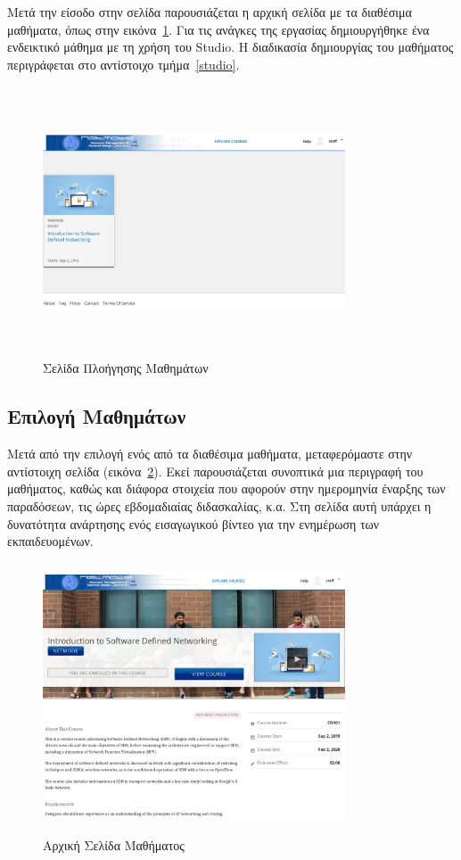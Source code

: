 \documentclass[12pt]{report}
\begin{document}
Μετά την είσοδο στην σελίδα παρουσιάζεται η αρχική σελίδα με τα διαθέσιμα μαθήματα, όπως στην εικόνα~\ref{fig:microsite-explore-course}. Για τις ανάγκες της εργασίας δημιουργήθηκε ένα ενδεικτικό μάθημα με τη χρήση του \textlatin{Studio}. Η διαδικασία δημιουργίας του μαθήματος περιγράφεται στο αντίστοιχο τμήμα~\ref{studio}.
\begin{figure}[!htbp]
\centering
\includegraphics[width=0.8\textwidth, height=8cm]{microsite-explore-courses}
\caption{Σελίδα Πλοήγησης Μαθημάτων}
\label{fig:microsite-explore-course}
\end{figure}

\subsection{Επιλογή Μαθημάτων}
Μετά από την επιλογή ενός από τα διαθέσιμα μαθήματα, μεταφερόμαστε στην αντίστοιχη σελίδα (εικόνα~\ref{fig:microsite-course1}). Εκεί παρουσιάζεται συνοπτικά μια περιγραφή του μαθήματος, καθώς και διάφορα στοιχεία που αφορούν στην ημερομηνία έναρξης των παραδόσεων, τις ώρες εβδομαδιαίας διδασκαλίας, κ.α. Στη σελίδα αυτή υπάρχει η δυνατότητα ανάρτησης ενός εισαγωγικού βίντεο για την ενημέρωση των εκπαιδευομένων.
\begin{figure}[!htbp]
\centering
\includegraphics[width=0.8\textwidth, height=8cm]{microsite-course1}
\caption{Αρχική Σελίδα Μαθήματος}
\label{fig:microsite-course1}
\end{figure}
\end{document}
